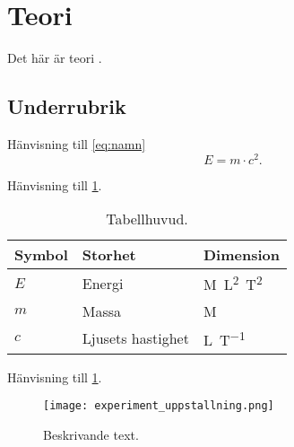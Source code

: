 \section{Teori}
Det här är teori \cite{einstein}.
\subsection{Underrubrik}
Hänvisning till \cref{eq:namn}
\begin{equation} \label{eq:namn}
    E=m \cdot c^2.
\end{equation}

Hänvisning till \cref{tab:namn}.
\begin{table}[H]
\centering
\caption{Tabellhuvud.}
\begin{tabular}{ l l l } \toprule
\textbf{Symbol} & \textbf{Storhet} & \textbf{Dimension} \\
\midrule
    $E$ & Energi & \si{M.L^2.T^{2}} \\
    $m$ & Massa &\si{M} \\
    $c$ & Ljusets hastighet & \si{L.T^{-1}} \\
\bottomrule 
\end{tabular} \label{tab:namn}
\end{table}

Hänvisning till \cref{fig:namn}.
\begin{figure} [H]
    \centering 
    \texttt{[image: experiment\_uppstallning.png]}
    \caption{Beskrivande text.}
    \label{fig:namn}
\end{figure}